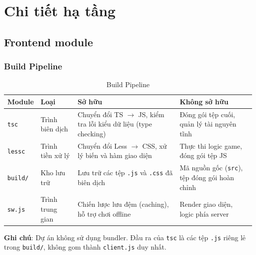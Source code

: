 \newpage

\section{Chi tiết hạ tầng}

\subsection{Frontend module}

\subsubsection{Build Pipeline}

\begin{table}[H]
    \centering
    \renewcommand{\arraystretch}{1.3}
    \setlength{\tabcolsep}{6pt}
    \begin{tabular}{|>{\RaggedRight\arraybackslash}p{2.8cm}|>{\RaggedRight\arraybackslash}p{2.8cm}|>{\RaggedRight\arraybackslash}p{4.8cm}|>{\RaggedRight\arraybackslash}p{4.8cm}|}
        \hline
        \rowcolor[rgb]{0.8, 0.9, 1.0}
        \textbf{Module} & \textbf{Loại} & \textbf{Sở hữu} & \textbf{Không sở hữu} \\ \hline

        \texttt{tsc} & Trình biên dịch &
        Chuyển đổi TS $\rightarrow$ JS, kiểm tra lỗi kiểu dữ liệu (type checking) &
        Đóng gói tệp cuối, quản lý tài nguyên tĩnh \\ \hline

        \texttt{lessc} & Trình tiền xử lý &
        Chuyển đổi Less $\rightarrow$ CSS, xử lý biến và hàm giao diện &
        Thực thi logic game, đóng gói tệp JS \\ \hline

        \texttt{build/} & Kho lưu trữ &
        Lưu trữ các tệp \texttt{.js} và \texttt{.css} đã biên dịch &
        Mã nguồn gốc (\texttt{src}), tệp đóng gói hoàn chỉnh \\ \hline

        \texttt{sw.js} & Trình trung gian &
        Chiến lược lưu đệm (caching), hỗ trợ chơi offline &
        Render giao diện, logic phía server \\ \hline

    \end{tabular}
    \caption{Build Pipeline}
\end{table}

\noindent \textbf{Ghi chú}: Dự án không sử dụng bundler. Đầu ra của \texttt{tsc} là các tệp \texttt{.js} riêng lẻ trong \texttt{build/}, không gom thành \texttt{client.js} duy nhất.

